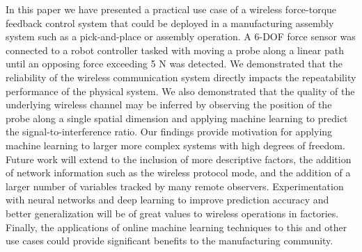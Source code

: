 In this paper we have presented a practical use case of a wireless force-torque feedback control system that could be deployed in a manufacturing assembly system such as a pick-and-place or assembly operation.  A 6-DOF force sensor was connected to a robot controller tasked with moving a probe along a linear path until an opposing force exceeding 5 N was detected.  We demonstrated that the reliability of the wireless communication system directly impacts the repeatability performance of the physical system. We also demonstrated that the quality of the underlying wireless channel may be inferred by observing the position of the probe along a single spatial dimension and applying machine learning to predict the signal-to-interference ratio. Our findings provide motivation for applying machine learning to larger more complex systems with high degrees of freedom. Future work will extend to the inclusion of more descriptive factors, the addition of network information such as the wireless protocol mode, and the addition of a larger number of variables tracked by many remote observers. Experimentation with neural networks and deep learning to improve prediction accuracy and better generalization will be of great values to wireless operations in factories.  Finally, the applications of online machine learning techniques to this and other use cases could provide significant benefits to the manufacturing community.